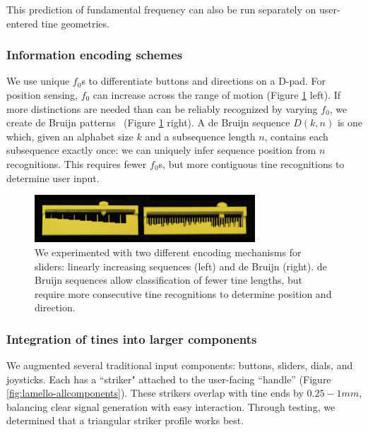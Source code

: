     This prediction of fundamental frequency can also be run separately on user-entered tine geometries.

        \subsubsection{Information encoding schemes}
        
        We use unique $f_0$s to differentiate buttons and directions on a D-pad. For position sensing, $f_0$ can increase across the range of motion (Figure \ref{fig:lamello-sliders} left). If more distinctions are needed than can be reliably recognized by varying $f_0$, we create de Bruijn patterns~\cite{debruijn-seqproof} (Figure \ref{fig:lamello-sliders} right). A de Bruijn sequence $D(k,n)$ is one which, given an alphabet size $k$ and a subsequence length $n$, contains each subsequence exactly once: we can uniquely infer sequence position from $n$ recognitions. This requires fewer $f_0$s, but more contiguous tine recognitions to determine user input.
        
        \begin{figure}
  \centering
    \includegraphics[width=3.25in]{figures/lamello/2sliders-sidebyside.jpg}
  \caption{We experimented with two different encoding mechanisms for sliders: linearly increasing sequences (left) and de Bruijn (right). de Bruijn sequences allow classification of fewer tine lengths, but require more consecutive tine recognitions to determine position and direction.}
  \label{fig:lamello-sliders}
\end{figure}

        \subsubsection{Integration of tines into larger components}

        We augmented several traditional input components: buttons, sliders, dials, and joysticks. Each has a ``striker" attached to the user-facing ``handle'' (Figure \ref{fig:lamello-allcomponents}). These strikers overlap with tine ends by $0.25-1mm$, balancing clear signal generation with easy interaction. Through testing, we determined that a triangular striker profile works best.

